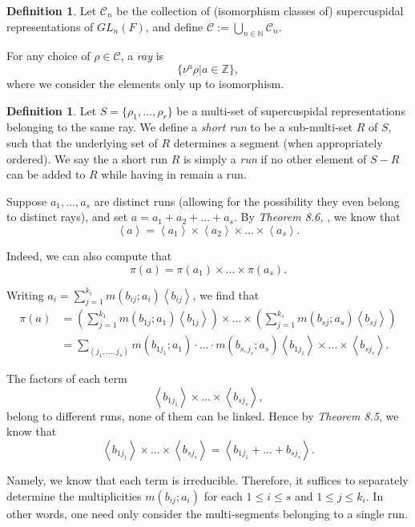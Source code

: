 \documentclass{memoir}
\newcommand{\mc}{\mathcal}
\newcommand{\la}{\left\langle}
\newcommand{\ra}{\right\rangle}
\newcommand{\lb}{\left(}
\newcommand{\rb}{\right)}
\newcommand{\bn}{\mathbb{N}}
\newcommand{\bz}{\mathbb{Z}}
\theoremstyle{definition}
\newtheorem{definition}[theorem]{Definition}
\begin{document}
	 	\begin{definition}
	 	Let $\mc{C}_n$ be the collection of (isomorphism classes of) supercuspidal representations of $GL_n(F)$, and define $\mc{C}:=\bigcup_{n\in \bn}\mc{C}_n$.  
	 	
	 	For any choice of $\rho\in\mc{C}$, a \emph{ray} is 
	 	$$\{\nu^a\rho | a\in \bz\},$$
	 	where we consider the elements only up to isomorphism. 
	 \end{definition}
 
 	\begin{definition}\label{run}
 		Let $S=\{\rho_1, ..., \rho_r\}$ be a multi-set of supercuspidal representations belonging to the same ray.  
 		We define a \emph{short run} to be a sub-multi-set $R$ of $S$, such that the underlying set of $R$ determines a segment (when appropriately ordered).  
 		We say the a short run $R$ is simply a \emph{run} if no other element of $S-R$ can be added to $R$ while having in remain a run.  
 	\end{definition}
	
	Suppose $a_1, ..., a_s$ are distinct runs (allowing for the possibility they even belong to distinct rays), and set $a=a_1+a_2+... +a_s$. 
	By \emph{Theorem 8.6,} \cite{ZelI2}, we know that
	$$\la a\ra=\la a_1\ra\times \la a_2\ra\times... \times\la a_s\ra.$$
	
	Indeed, we can also compute that 
	$$\pi(a)=\pi(a_1)\times... \times \pi(a_s).$$
	
	
	Writing $a_i=\sum_{j=1}^{k_i}m(b_{ij};a_i)\la b_{ij}\ra$, we find that 
	\begin{align}
		\pi(a)&=\lb \sum_{j=1}^{k_1}m(b_{1j};a_1)\la b_{1j}\ra\rb\times... \times\lb \sum_{j=1}^{k_s}m(b_{sj};a_s)\la b_{sj}\ra\rb\\
		&=\sum_{(j_1, ..., j_s)} m(b_{1j_1};a_1)\cdot... \cdot m(b_{s,j_s};a_s) \la b_{1j_1}\ra\times... \times\la b_{sj_s}\ra.\label{SpecRay}
	\end{align} 
	
	The factors of each term
	$$\la b_{1j_1}\ra\times... \times\la b_{sj_s}\ra,$$
	belong to different runs, none of them can be linked.    
	Hence by \emph{Theorem 8.5}, \cite{ZelI2} we know that 
	$$\la b_{1j_1}\ra\times... \times\la b_{sj_s}\ra=\la b_{1j_1}+... +b_{sj_s}\ra.$$
	
	Namely, we know that each term is irreducible.  
	Therefore, it suffices to separately determine the multiplicities $m(b_{ij};a_i)$ for each $1\leq i \leq s$ and $1\leq j\leq k_i$.  
	In other words, one need only consider the multi-segments belonging to a single run.  
	
\end{document}
